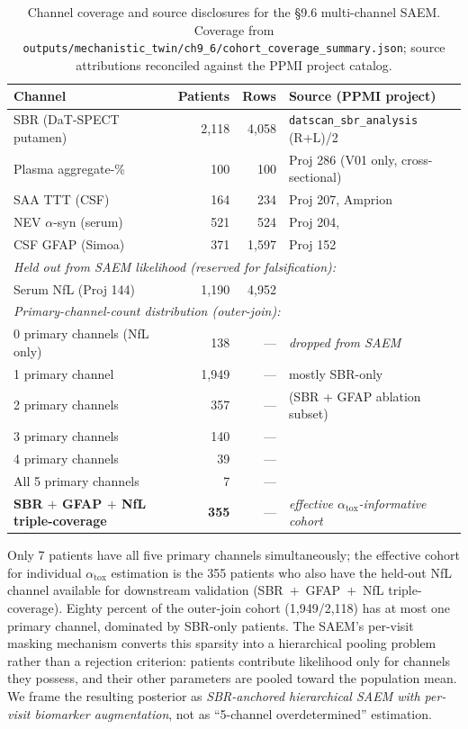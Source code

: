 \begin{table}[t!]
\centering
\caption[Channel coverage and source disclosures]{Channel coverage and source disclosures for the §9.6 multi-channel SAEM. Coverage from \texttt{outputs/mechanistic\_twin/ch9\_6/cohort\_coverage\_summary.json}; source attributions reconciled against the PPMI project catalog.}
\label{tab:ch9-6-coverage}
\small
\begin{tabular}{lrrl}
\toprule
\textbf{Channel} & \textbf{Patients} & \textbf{Rows} & \textbf{Source (PPMI project)} \\
\midrule
SBR (DaT-SPECT putamen) & 2{,}118 & 4{,}058 & \texttt{datscan\_sbr\_analysis} (R+L)/2 \\
Plasma aggregate-\% & 100 & 100 & Proj 286 (V01 only, cross-sectional) \\
SAA TTT (CSF) & 164 & 234 & Proj 207, Amprion \\
NEV $\alpha$-syn (serum) & 521 & 524 & Proj 204,~\cite{yan2023nev} \\
CSF GFAP (Simoa) & 371 & 1{,}597 & Proj 152 \\
\midrule
\multicolumn{4}{l}{\emph{Held out from SAEM likelihood (reserved for falsification):}} \\
Serum NfL (Proj 144) & 1{,}190 & 4{,}952 &~\cite{backstrom2020nfl,sampedro2020nfl} \\
\midrule
\multicolumn{4}{l}{\emph{Primary-channel-count distribution (outer-join):}} \\
0 primary channels (NfL only) & 138 & --- & \emph{dropped from SAEM} \\
1 primary channel & 1{,}949 & --- & mostly SBR-only \\
2 primary channels & 357 & --- & (SBR + GFAP ablation subset) \\
3 primary channels & 140 & --- & \\
4 primary channels & 39 & --- & \\
All 5 primary channels & 7 & --- & \\
\midrule
\textbf{SBR $+$ GFAP $+$ NfL triple-coverage} & \textbf{355} & --- & \emph{effective $\alpha_\text{tox}$-informative cohort} \\
\bottomrule
\end{tabular}
\end{table}

Only 7 patients have all five primary channels simultaneously; the effective cohort for individual $\alpha_\text{tox}$ estimation is the 355 patients who also have the held-out NfL channel available for downstream validation (SBR~$+$~GFAP~$+$~NfL triple-coverage). Eighty percent of the outer-join cohort (1,949/2,118) has at most one primary channel, dominated by SBR-only patients. The SAEM's per-visit masking mechanism converts this sparsity into a hierarchical pooling problem rather than a rejection criterion: patients contribute likelihood only for channels they possess, and their other parameters are pooled toward the population mean. We frame the resulting posterior as \emph{SBR-anchored hierarchical SAEM with per-visit biomarker augmentation}, not as ``5-channel overdetermined'' estimation.

